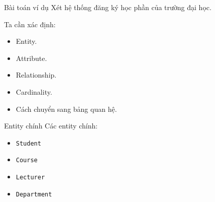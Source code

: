 \documentclass[aspectratio=169,11pt]{beamer}
\newcommand{\smallitem}{\setlength{\itemsep}{2pt}\setlength{\parskip}{0pt}}
\begin{document}
\begin{frame}{Bài toán ví dụ}
\small
Xét hệ thống đăng ký học phần của trường đại học.

\vspace{2mm}
Ta cần xác định:
\begin{itemize}
\smallitem
  \item Entity.
  \item Attribute.
  \item Relationship.
  \item Cardinality.
  \item Cách chuyển sang bảng quan hệ.
\end{itemize}
\end{frame}

\begin{frame}{Entity chính}
\small
Các entity chính:
\begin{itemize}
\smallitem
  \item \texttt{Student}
  \item \texttt{Course}
  \item \texttt{Lecturer}
  \item \texttt{Department}
\end{itemize}
\end{frame}
\end{document}
